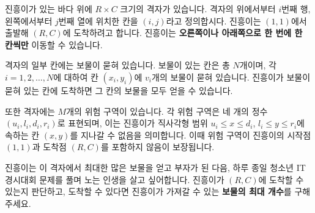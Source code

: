 진흥이가 있는 바다 위에 $R \times C$ 크기의 격자가 있습니다. 격자의 위에서부터 $i$번째 행, 왼쪽에서부터 $j$번째 열에 위치한 칸을 $(i, j)$라고 정의합시다. 진흥이는 $(1, 1)$에서 출발해 $(R, C)$에 도착하려고 합니다. 진흥이는 \textbf{오른쪽이나 아래쪽으로 한 번에 한 칸씩만} 이동할 수 있습니다.

격자의 일부 칸에는 보물이 묻혀 있습니다. 보물이 있는 칸은 총 $N$개이며, 각 $i=1,2,\ldots,N$에 대하여 칸 $(x_i, y_i)$에 $v_i$개의 보물이 묻혀 있습니다. 진흥이가 보물이 묻혀 있는 칸에 도착하면 그 칸의 보물을 모두 얻을 수 있습니다. 

또한 격자에는 $M$개의 위험 구역이 있습니다. 각 위험 구역은 네 개의 정수 $(u_i, l_i, d_i, r_i)$로 표현되며, 이는 진흥이가 직사각형 범위 $u_i \le x \le d_i$, $l_i \le y \le r_i$에 속하는 칸 $(x, y)$를 지나갈 수 없음을 의미합니다. 이때 위험 구역이 진흥이의 시작점 $(1, 1)$과 도착점 $(R, C)$를 포함하지 않음이 보장됩니다. 

진흥이는 이 격자에서 최대한 많은 보물을 얻고 부자가 된 다음, 하루 종일 청소년 IT경시대회 문제를 풀며 노는 인생을 살고 싶어합니다. 진흥이가 $(R,C)$에 도착할 수 있는지 판단하고, 도착할 수 있다면 진흥이가 가져갈 수 있는 \textbf{보물의 최대 개수}를 구해 주세요.